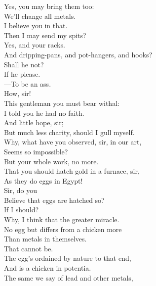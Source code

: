 \documentclass[a4paper,oneside,12pt]{memoir}
\begin{document}
\begin{drama*}
\subtlespeaks {} Yes, you may bring them too:\\
We'll change all metals.\\
\surlyspeaks {} I believe you in that.\\
\mammonspeaks Then I may send my spits?\\
\subtlespeaks {} Yes, and your racks.\\
\surlyspeaks And dripping-pans, and pot-hangers, and hooks?\\
Shall he not?\\
\subtlespeaks {} If he please.\\
\surlyspeaks {} ---To be an ass.\\
\subtlespeaks How, sir!\\
\mammonspeaks {} This gentleman you must bear withal:\\
I told you he had no faith.\\
\surlyspeaks {} And little hope, sir;\\
But much less charity, should I gull myself.\\
\subtlespeaks Why, what have you observed, sir, in our art,\\
Seems so impossible?\\
\surlyspeaks {} But your whole work, no more.\\
That you should hatch gold in a furnace, sir,\\
As they do eggs in Egypt!\\
\subtlespeaks {} Sir, do you\\
Believe that eggs are hatched so?\\
\surlyspeaks {} If I should?\\
\subtlespeaks Why, I think that the greater miracle.\\
No egg but differs from a chicken more\\
Than metals in themselves.\\
\surlyspeaks {} That cannot be.\\
The egg's ordained by nature to that end,\\
And is a chicken in potentia.\\
\subtlespeaks The same we say of lead and other metals,\\

\end{drama*}
\end{document}
